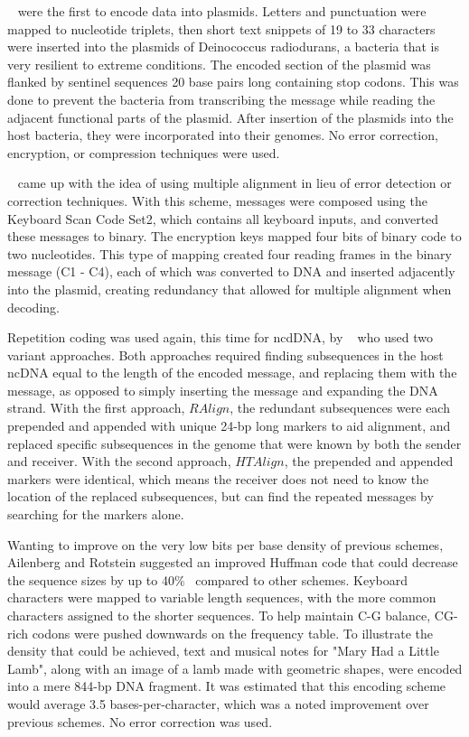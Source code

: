 \documentclass{bioinfo}
\begin{document}
~\cite{WWF2003COTACM} were the first to encode data into plasmids. Letters and punctuation were mapped to nucleotide triplets, then short text snippets of 19 to 33 characters were inserted into the plasmids of Deinococcus radiodurans, a bacteria that is very resilient to extreme conditions. The encoded section of the plasmid was flanked by sentinel sequences 20 base pairs long containing stop codons. This was done to prevent the bacteria from transcribing the message while reading the adjacent functional parts of the plasmid. After insertion of the plasmids into the host bacteria, they were incorporated into their genomes. No error correction, encryption, or compression techniques were used.

~\cite{YSSOT2007BP} came up with the idea of using multiple alignment in lieu of error detection or correction techniques. With this scheme, messages were composed using the Keyboard Scan Code Set2, which contains all keyboard inputs, and converted these messages to binary. The encryption keys mapped four bits of binary code to two nucleotides. This type of mapping created four reading frames in the binary message (C1 - C4), each of which was converted to DNA and inserted adjacently into the plasmid, creating redundancy that allowed for multiple alignment when decoding.

Repetition coding was used again, this time for ncdDNA, by ~\cite{HB2011IEEEICOBAB} who used two variant approaches. Both approaches required finding subsequences in the host ncDNA equal to the length of the encoded message, and replacing them with the message, as opposed to simply inserting the message and expanding the DNA strand. With the first approach, $RAlign$, the redundant subsequences were each prepended and appended with unique 24-bp long markers to aid alignment, and replaced specific subsequences in the genome that were known by both the sender and receiver. With the second approach, $HTAlign$, the prepended and appended markers were identical, which means the receiver does not need to know the location of the replaced subsequences, but can find the repeated messages by searching for the markers alone.

Wanting to improve on the very low bits per base density of previous schemes, Ailenberg and Rotstein suggested an improved Huffman code that could decrease the sequence sizes by up to 40\%~\cite{AR2009BT} compared to other schemes. Keyboard characters were mapped to variable length sequences, with the more common characters assigned to the shorter sequences. To help maintain C-G balance, CG-rich codons were pushed downwards on the frequency table. To illustrate the density that could be achieved, text and musical notes for "Mary Had a Little Lamb", along with an image of a lamb made with geometric shapes, were encoded into a mere 844-bp DNA fragment. It was estimated that this encoding scheme would average 3.5 bases-per-character, which was a noted improvement over previous schemes. No error correction was used.
\end{document}
